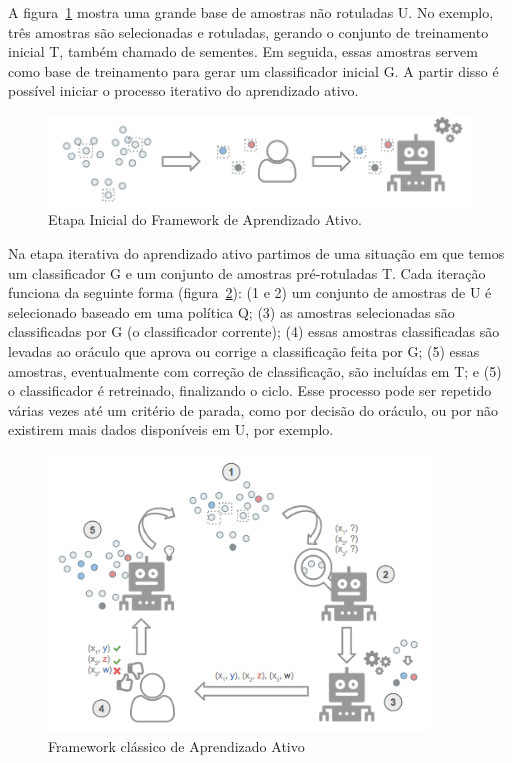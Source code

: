 A figura~\ref{fig:framework_AL_classico_etapa_inicial} mostra  uma grande base de amostras não rotuladas U. No exemplo, três amostras são selecionadas e rotuladas, gerando o conjunto de treinamento inicial T, também chamado de sementes. Em seguida, essas amostras servem como base de treinamento para gerar um classificador inicial G. A partir disso é possível iniciar o processo iterativo do aprendizado ativo. 


\begin{figure}
  \centering
  \includegraphics[width=.9\textwidth]{figures/Framework_processo_inicial.png}
  \caption{Etapa Inicial do Framework de Aprendizado Ativo. }
  \label{fig:framework_AL_classico_etapa_inicial}
\end{figure}

Na etapa iterativa do aprendizado ativo partimos de uma situação em que temos um classificador G e um conjunto de amostras pré-rotuladas T. Cada iteração funciona da seguinte forma (figura~\ref{fig:framework_AL_classico}): (1 e 2) um conjunto de amostras de U é selecionado baseado em uma política Q; (3) as amostras selecionadas são classificadas por G (o classificador corrente); (4) essas amostras classificadas são levadas ao oráculo que aprova ou corrige a classificação feita por G; (5) essas amostras, eventualmente com correção de classificação, são incluídas em T;  e (5) o classificador é retreinado, finalizando o ciclo. Esse processo pode ser repetido várias vezes até um critério de parada, como por decisão do oráculo, ou por não existirem mais dados disponíveis em U, por exemplo. 


\begin{figure}
  \centering
  \includegraphics[width=0.9\textwidth]{figures/Framework_Active_Learning_Classico_v2.png}
  \caption{Framework clássico de Aprendizado Ativo}
  \label{fig:framework_AL_classico}
\end{figure}



